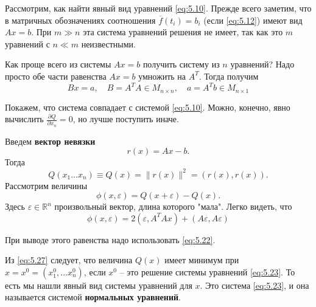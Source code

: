 Рассмотрим, как найти явный вид уравнений \ref{eq:5.10}. Прежде всего заметим, что в матричных обозначениях соотношения $\overline f(t_i) = b_i$ (если \ref{eq:5.12}) имеют вид $Ax=b$. При $m\gg n$ эта система уравнений решения не имеет, так как это $m$ уравнений с $n \ll m$ неизвестными. 

Как проще всего из системы $Ax=b$ получить систему из $n$ уравнений? Надо просто обе части равенства $Ax=b$ умножить на $A^T$. Тогда получим
\begin{equation}\label{eq:5.23}
	Bx = a, \quad B = A^T A \in M_{n\times n}, \quad a=A^T b \in M_{n\times 1}
\end{equation}

Покажем, что система совпадает с системой \ref{eq:5.10}. Можно, конечно, явно вычислить $\frac{\partial Q}{\partial x_n} = 0$, но лучше поступить иначе.

Введем \textbf{вектор невязки}
\begin{equation}
	r(x) = Ax - b.
\end{equation}
Тогда
\begin{equation}
	Q(x_1 \dots x_n) \equiv Q(x) = \|r(x)\| ^2 = (r(x), r(x)).
\end{equation}
Рассмотрим величины
\begin{equation}
	\phi (x, \varepsilon ) = Q (x + \varepsilon ) - Q(x).
\end{equation}
Здесь $\varepsilon \in \mathbb{R}^n$ произвольный вектор, длина которого "мала". Легко видеть, что
\begin{equation}\label{eq:5.27}
	\phi (x, \varepsilon ) = 2(\varepsilon, A^T A x) + (A\varepsilon, A\varepsilon)
\end{equation}

При выводе этого равенства надо использовать \ref{eq:5.22}.

Из \ref{eq:5.27} следует, что величина $Q(x)$ имеет минимум при $x = x^0 = (x_1^0, \dots x_n^0)$, если $x^0$ -- это решение системы уравнений \ref{eq:5.23}.
То есть мы нашли явный вид системы уравнений для $x$. Это система \ref{eq:5.23}, и она называется системой \textbf{нормальных уравнений}.